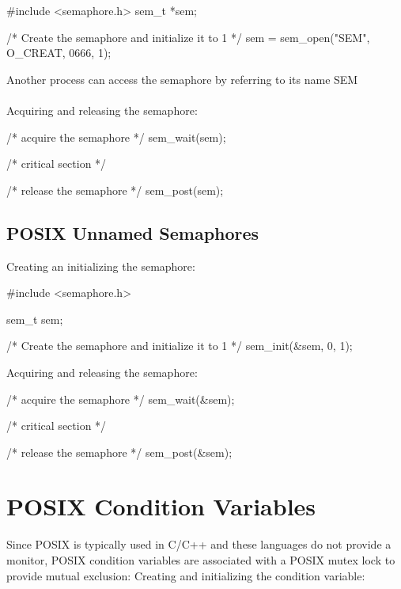 \begin{codeInC}
#include <semaphore.h>
sem_t *sem;

/* Create the semaphore and initialize it to 1 */
sem = sem_open("SEM", O_CREAT, 0666, 1);

\end{codeInC}

Another process can access the semaphore by referring to its name SEM


\paragraph{}
Acquiring and releasing the semaphore:
\begin{codeInC}
/* acquire the semaphore */
sem_wait(sem);

/* critical section */

/* release the semaphore */
sem_post(sem);

\end{codeInC}


\subsection{POSIX Unnamed Semaphores}

Creating an initializing the semaphore:

\begin{codeInC}
#include <semaphore.h>

sem_t sem;

/* Create the semaphore and initialize it to 1 */
sem_init(&sem, 0, 1);

\end{codeInC}

Acquiring and releasing the semaphore:

\begin{codeInC}
/* acquire the semaphore */
sem_wait(&sem);

/* critical section */

/* release the semaphore */
sem_post(&sem);

\end{codeInC}

\newpage
\section{POSIX Condition Variables}

Since POSIX is typically used in C/C++ and these languages do not
provide a monitor, POSIX condition variables are associated with a
POSIX mutex lock to provide mutual exclusion: Creating and initializing
the condition variable:


